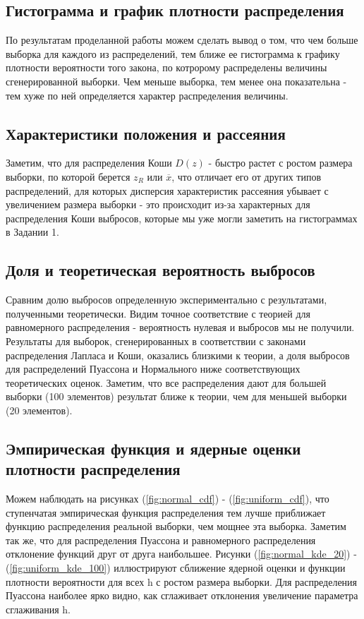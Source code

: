 \documentclass[../body.tex]{subfiles}
\begin{document}
	\subsection{Гистограмма и график плотности распределения}
	По результатам проделанной работы можем сделать вывод о том, что чем больше выборка для каждого из распределений, тем ближе ее гистограмма к графику плотности вероятности того закона, по котророму распределены величины сгенерированной выборки. Чем меньше выборка, тем менее она показательна - тем хуже по ней определяется характер распределения величины.
	\subsection{Характеристики положения и рассеяния}
	Заметим, что для распределения Коши $D(z)$ - быстро растет с ростом размера выборки, по которой берется $z_R$ или $\overline{x}$, что отличает его от других типов распределений, для которых дисперсия характеристик рассеяния убывает с увеличением размера выборки - это происходит из-за характерных для распределения Коши выбросов, которые мы уже могли заметить на гистограммах в Задании 1.
	\subsection{Доля и теоретическая вероятность выбросов}
	Сравним долю выбросов определенную экспериментально с результатами, полученными теоретически. Видим точное соответствие с теорией для равномерного распределения - вероятность нулевая и выбросов мы не получили.\newline
	Результаты для выборок, сгенерированных в соответствии с законами распределения Лапласа и Коши, оказались близкими к теории, а доля выбросов для распределений Пуассона и Нормального ниже соответствующих теоретических оценок.\newline
	Заметим, что все распределения дают для большей выборки (100 элементов) результат ближе к теории, чем для меньшей выборки (20 элементов).
	\subsection{Эмпирическая функция и ядерные оценки плотности распределения}
	Можем наблюдать на рисунках (\ref{fig:normal_cdf}) - (\ref{fig:uniform_cdf}), что ступенчатая эмпирическая функция распределения тем лучше приближает функцию распределения реальной выборки, чем мощнее эта выборка. Заметим так же, что для распределения Пуассона и равномерного распределения отклонение функций друг от друга наибольшее.
	\newline
	Рисунки (\ref{fig:normal_kde_20}) - (\ref{fig:uniform_kde_100}) иллюстрируют сближение ядерной оценки и функции плотности вероятности для всех h с ростом размера выборки. Для распределения Пуассона наиболее ярко видно, как сглаживает отклонения увеличение параметра сглаживания h.
\end{document}
